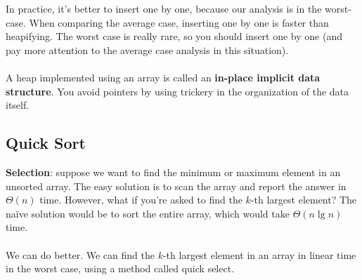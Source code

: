 \documentclass[]{article}
\theoremstyle{definition}
\begin{document}
			In practice, it's better to insert one by one, because our analysis is in the worst-case. When comparing the average case, inserting one by one is faster than heapifying. The worst case is really rare, so you should insert one by one (and pay more attention to the average case analysis in this situation).
			\\ \\
			A heap implemented using an array is called an \textbf{in-place implicit data structure}. You avoid pointers by using trickery in the organization of the data itself.
		\subsection{Quick Sort}
			\textbf{Selection}: suppose we want to find the minimum or maximum element in an unsorted array. The easy solution is to scan the array and report the answer in $\Theta(n)$ time. However, what if you're asked to find the $k$-th largest element? The na\"ive solution would be to sort the entire array, which would take $\Theta(n \lg n)$ time.
			\\ \\
			We can do better. We can find the $k$-th largest element in an array in linear time in the worst case, using a method called quick select.
\end{document}
